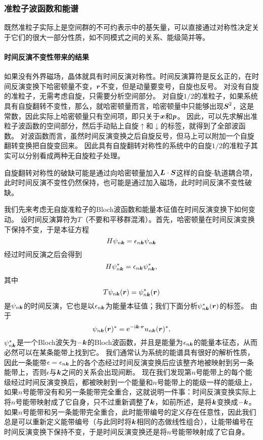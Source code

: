 \subsubsection{准粒子波函数和能谱}\label{sec:quasi-particle-spectrum}

既然准粒子实际上是空间群的不可约表示中的基矢量，可以直接通过对称性决定关于它们的很大一部分性质，如不同模式之间的关系、能级简并等。

\paragraph{时间反演不变性带来的结果} 如果没有外界磁场，晶体就具有时间反演对称性。时间反演算符是反幺正的，在时间反演变换下哈密顿量不变，$\vb*{r}$不变，但是动量要变号，自旋也反号。
对没有自旋的准粒子，无需考虑自旋，只需要分析空间部分。
对自旋$1/2$的准粒子，如果系统具有自旋翻转不变性，那么，就哈密顿量而言，哈密顿量中只能够出现$\vb*{S}^2$，这是常数，因此实际上哈密顿量只有空间项，即只关于$\vb*{x}$和$\vb*{p}$。
因此，可以先求解出准粒子波函数的空间部分，然后手动贴上自旋$\uparrow$和$\downarrow$的标签，就得到了全部波函数。
对波函数而言，虽然时间反演变换之后自旋反号，但马上可以附加一个自旋翻转变换把自旋变回来。
因此具有自旋翻转对称性的系统中的自旋$1/2$的准粒子其实可以分别看成两种无自旋粒子处理。

自旋翻转对称性的破缺可能是通过向哈密顿量加入$\vb*{L} \cdot \vb*{S}$这样的自旋-轨道耦合项，此时时间反演不变性仍然保持，也可能是通过加入磁场，此时时间反演不变性破缺。

我们先来考虑无自旋准粒子的Bloch波函数和能量本征值在时间反演变换下如何变动。
设时间反演算符为$T$（不要和平移群混淆）。首先，哈密顿量在时间反演变换下保持不变，于是本征方程
\[
    H \psi_{n \vb*{k}} = \epsilon_{n \vb*{k}} \psi_{n \vb*{k}}
\]
经过时间反演之后会得到
\[
    H \psi_{n \vb*{k}}^* = \epsilon_{n \vb*{k}} \psi_{n \vb*{k}}^*,
\]
其中
\[
    T \psi_{n \vb*{k}}(\vb*{r}) = \psi^*_{n \vb*{k}}(\vb*{r})
\]
是$\psi_{n \vb*{k}}$的时间反演，它也是以$\epsilon_{n \vb*{k}}$为能量本征值；我们下面分析$\psi^*_{n \vb*{k}}(\vb*{r})$的标签。
由于
\[
    \psi_{n \vb*{k}}(\vb*{r})^* = \mathrm{e}^{- \mathrm{i} \vb*{k} \cdot \vb*{r}} u_{n \vb*{k}}(\vb*{r})^*,
\]
$\psi_{n \vb*{k}}^*$是一个Bloch波矢为$-\vb*{k}$的Bloch波函数，并且是能量为$\epsilon_{n \vb*{k}}$的能量本征态，从而必然可以在某条能带上找到它。
我们通常认为系统的能谱具有很好的解析性质，因此一条能带$\epsilon = \epsilon_{n \vb*{k}}$上的各个态经过时间反演变换后应该整齐地被映射到另一条能带上，否则$\epsilon$与$\vb*{k}$之间的关系会出现间断。
现在我们发现第$n$号能带上的每个能级经过时间反演变换后，都被映射到一个能量和$n$号能带上的能级一样的能级上，如果$n$号能带没有和另一条能带完全重合，这就说明一件事：时间反演变换实际上将$n$号能带映射成了它自身，只不过重新调整了$\vb*{k}$，如前所述，是将$\vb*{k}$变换成$- \vb*{k}$。
如果$n$号能带和另一条能带完全重合，此时能带编号的定义存在任意性，因此我们总是可以重新定义能带编号（与此同时将$\vb*{k}$相同的态做线性组合），让能带编号在时间反演变换下保持不变，于是时间反演变换还是将$n$号能带映射成了它自身。

